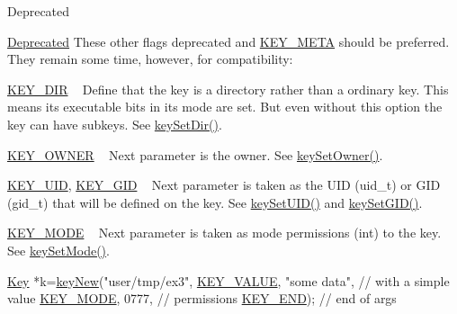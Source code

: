 \begin{DoxyRefDesc}{Deprecated}
\item[\hyperlink{deprecated__deprecated000008}{Deprecated}]These other flags deprecated and \hyperlink{group__key_gga91fb3178848bd682000958089abbaf40a040582834bb2d90049947d7ef74e87e2}{K\+E\+Y\+\_\+\+M\+E\+T\+A} should be preferred. They remain some time, however, for compatibility\+:
\begin{DoxyItemize}
\item \hyperlink{group__key_gga91fb3178848bd682000958089abbaf40a9e43e47c8a21478538e2d20e049981d5}{K\+E\+Y\+\_\+\+D\+I\+R} ~\newline
 Define that the key is a directory rather than a ordinary key. This means its executable bits in its mode are set. But even without this option the key can have subkeys. See \hyperlink{group__meta_gaae575bd86a628a15ee45baa860522e75}{key\+Set\+Dir()}.
\item \hyperlink{group__key_gga91fb3178848bd682000958089abbaf40a77ca60362fa8daca8d5347db4385068b}{K\+E\+Y\+\_\+\+O\+W\+N\+E\+R} ~\newline
 Next parameter is the owner. See \hyperlink{owner_8c_a88d6ec200ba0707b7c1b4a88133d2be4}{key\+Set\+Owner()}.
\item \hyperlink{group__key_gga91fb3178848bd682000958089abbaf40a28f01a87d65f065172f734c9c9446c0e}{K\+E\+Y\+\_\+\+U\+I\+D}, \hyperlink{group__key_gga91fb3178848bd682000958089abbaf40ac0628bbaba7c837ca73323681393d15f}{K\+E\+Y\+\_\+\+G\+I\+D} ~\newline
 Next parameter is taken as the U\+I\+D (uid\+\_\+t) or G\+I\+D (gid\+\_\+t) that will be defined on the key. See \hyperlink{group__meta_gab5f284f5ecd261e0a290095f50ba1af7}{key\+Set\+U\+I\+D()} and \hyperlink{group__meta_ga9e3d0fb3f7ba906e067727b9155d22e3}{key\+Set\+G\+I\+D()}.
\item \hyperlink{group__key_gga91fb3178848bd682000958089abbaf40a1b0a91ff3a855d6993930ebf0abaa518}{K\+E\+Y\+\_\+\+M\+O\+D\+E} ~\newline
 Next parameter is taken as mode permissions (int) to the key. See \hyperlink{group__meta_ga8803037e35b9da1ce492323a88ff6bc3}{key\+Set\+Mode()}. 
\begin{DoxyCodeInclude}
\hyperlink{classkdb_1_1Key_a5679f5cae63caddd64a60388b9cc77fa}{Key} *k=\hyperlink{group__key_gad23c65b44bf48d773759e1f9a4d43b89}{keyNew}(\textcolor{stringliteral}{"user/tmp/ex3"},
        \hyperlink{group__key_gga91fb3178848bd682000958089abbaf40ac66e4a49d09212b79f5754ca6db5bd2e}{KEY\_VALUE}, \textcolor{stringliteral}{"some data"},    \textcolor{comment}{// with a simple value}
        \hyperlink{group__key_gga91fb3178848bd682000958089abbaf40a1b0a91ff3a855d6993930ebf0abaa518}{KEY\_MODE}, 0777,            \textcolor{comment}{// permissions}
        \hyperlink{group__key_gga91fb3178848bd682000958089abbaf40aa8adb6fcb92dec58fb19410eacfdd403}{KEY\_END});                  \textcolor{comment}{// end of args}
\end{DoxyCodeInclude}


\end{DoxyItemize}
\end{DoxyRefDesc}
